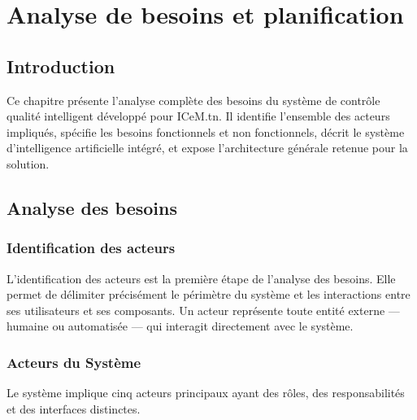 \chapter{Analyse de besoins et planification}

\section*{Introduction}

Ce chapitre présente l'analyse complète des besoins du système de contrôle qualité intelligent développé pour ICeM.tn. Il identifie l'ensemble des acteurs impliqués, spécifie les besoins fonctionnels et non fonctionnels, décrit le système d'intelligence artificielle intégré, et expose l'architecture générale retenue pour la solution.

\section{Analyse des besoins}

\subsection{Identification des acteurs}

L'identification des acteurs est la première étape de l'analyse des besoins. Elle permet de délimiter précisément le périmètre du système et les interactions entre ses utilisateurs et ses composants. Un acteur représente toute entité externe — humaine ou automatisée — qui interagit directement avec le système.

\subsection{Acteurs du Système}

Le système implique cinq acteurs principaux ayant des rôles, des responsabilités et des interfaces distinctes.

